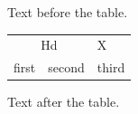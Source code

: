 \documentclass[12pt]{article}
\begin{document}
Text before the table.

\begin{tabular}{lll}\multicolumn{2}{c}{Hd}& X\\first & second & third\end{tabular}

Text after the table.
\end{document}
